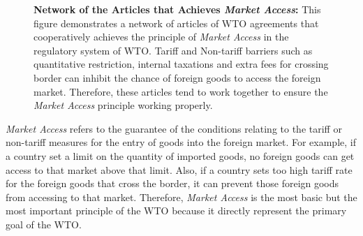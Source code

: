 
\begin{figure}[ht]
    \centering{
        
    }
    \caption{{\bf Network of the Articles that Achieves \textit{Market Access}:}
        This figure demonstrates a network of articles of WTO agreements
        that cooperatively achieves the principle of \textit{Market Access} in the regulatory system of WTO.
        Tariff and Non-tariff barriers such as quantitative restriction, internal taxations
        and extra fees for crossing border can inhibit the chance of foreign goods to access the foreign market.
        Therefore, these articles tend to work together to ensure the \textit{Market Access} principle working properly.
    }
    \label{fig:market-aceess_directed}
  \end{figure}
  
\textit{Market Access} 
refers to the guarantee of the conditions relating to the 
tariff or non-tariff measures 
for the entry of 
goods into the foreign market. For example, if 
a country set a limit on the quantity of imported goods, no foreign goods can get access to that market above that limit. Also, if a country sets too high tariff rate for the foreign goods that cross the border, 
it can prevent those foreign goods from accessing to that market.
Therefore, \textit{Market Access} is the most basic but the most important principle of the WTO
because it directly represent the primary goal of the WTO.

